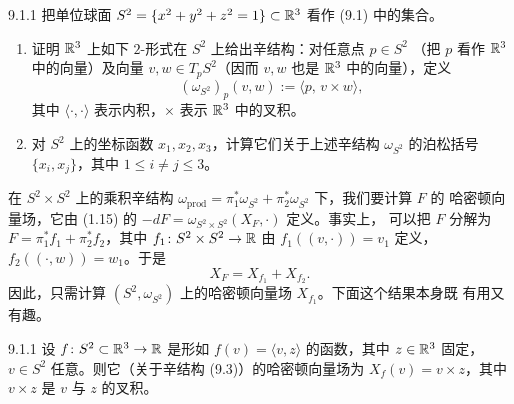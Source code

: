 \begin{wexer}{9.1.1}
  把单位球面 $S^2=\{x^2+y^2+z^2=1\}\subset\mathbb{R}^3$ 看作 (9.1) 中的集合。
  \begin{enumerate}[label=(\roman*)]
    \item 证明 $\mathbb{R}^3$ 上如下 $2$-形式在 $S^2$ 上给出辛结构：对任意点 $p\in S^2$
      （把 $p$ 看作 $\mathbb{R}^3$ 中的向量）及向量 $v,w\in T_pS^2$（因而 $v,w$ 也是
      $\mathbb{R}^3$ 中的向量），定义
      \begin{equation}\tag{9.3}
        (\omega_{S^2})_p(v,w):=\langle p,\,v\times w\rangle,
      \end{equation}
      其中 $\langle\cdot,\cdot\rangle$ 表示内积，$\times$ 表示 $\mathbb{R}^3$ 中的叉积。
    \item 对 $S^2$ 上的坐标函数 $x_1,x_2,x_3$，计算它们关于上述辛结构
      $\omega_{S^2}$ 的泊松括号 $\{x_i,x_j\}$，其中 $1\leqslant i\neq j\leqslant3$。
  \end{enumerate}
\end{wexer}

在 $S^2\times S^2$ 上的乘积辛结构
$\omega_{\mathrm{prod}}=\pi_1^*\omega_{S^2}+\pi_2^*\omega_{S^2}$ 下，我们要计算 $F$ 的
哈密顿向量场，它由 (1.15) 的 $-dF=\omega_{S^2\times S^2}(X_F,\cdot)$ 定义。事实上，
可以把 $F$ 分解为 $F=\pi_1^*f_1+\pi_2^*f_2$，其中 $f_1\colon S^2\times S^2\to\mathbb{R}$ 由
$f_1((v,\cdot))=v_1$ 定义，$f_2((\cdot,w))=w_1$。于是
\begin{equation*}
  X_F=X_{f_1}+X_{f_2}.
\end{equation*}
因此，只需计算 $(S^2,\omega_{S^2})$ 上的哈密顿向量场 $X_{f_1}$。下面这个结果本身既
有用又有趣。

\begin{wlem}{9.1.1}
  设 $f\colon S^2\subset\mathbb{R}^3\to\mathbb{R}$ 是形如 $f(v)=\langle v,z\rangle$ 的函数，其中
  $z\in\mathbb{R}^3$ 固定，$v\in S^2$ 任意。则它（关于辛结构 (9.3)）的哈密顿向量场为
  $X_f(v)=v\times z$，其中 $v\times z$ 是 $v$ 与 $z$ 的叉积。
\end{wlem}

